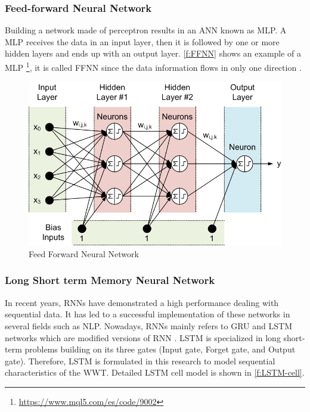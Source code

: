 \subsubsection{Feed-forward Neural Network}
Building a network made of perceptron results in an \ac{ANN} known as \ac{MLP}. A \ac{MLP} receives the data in an input layer, then it is followed by one or more hidden layers and ends up with an output layer.
\autoref{f:FFNN} shows an example of a \ac{MLP} \footnote{\url{https://www.mql5.com/es/code/9002}}, it is called \ac{FFNN} since the data information flows in only one direction \cite{geron2017}. 

\begin{figure}[h]
\centering
\includegraphics[width=12cm]{figures/Ch2/FFNN.png}
\caption{Feed Forward Neural Network}
\label{f:FFNN}
\end{figure}

\subsubsection{Long Short term Memory Neural Network}
In recent years, \ac{RNN}s have demonstrated a high performance dealing with sequential data. It has led to a successful implementation of these networks in several fields such as \ac{NLP}.
Nowadays, \ac{RNN}s mainly refers to \ac{GRU} and \ac{LSTM} networks which are modified versions of \ac{RNN} \cite{Guo2020}. \ac{LSTM} is specialized in long short-term problems building on its three gates (Input gate, Forget gate, and Output gate). Therefore, \ac{LSTM} is formulated in this research to model sequential characteristics of the \ac{WWT}. Detailed \ac{LSTM} cell model is shown in \autoref{f:LSTM-cell}.

